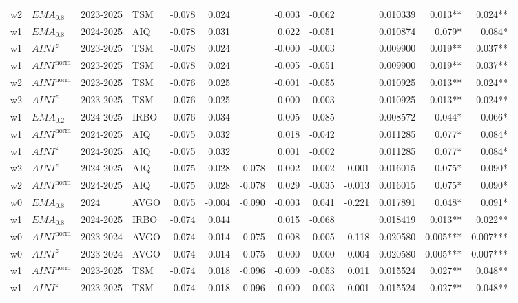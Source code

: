 \begin{longtable}{@{}llllrrrrrrrrr@{}}
w2 & $EMA_{0.8}$ & 2023-2025 & TSM & -0.078 & 0.024 &  & -0.003 & -0.062 &  & 0.010339 & 0.013** & 0.024** \\
w1 & $EMA_{0.8}$ & 2024-2025 & AIQ & -0.078 & 0.031 &  & 0.022 & -0.051 &  & 0.010874 & 0.079* & 0.084* \\
w1 & $AINI^{z}$ & 2023-2025 & TSM & -0.078 & 0.024 &  & -0.000 & -0.003 &  & 0.009900 & 0.019** & 0.037** \\
w1 & $AINI^{\mathrm{norm}}$ & 2023-2025 & TSM & -0.078 & 0.024 &  & -0.005 & -0.051 &  & 0.009900 & 0.019** & 0.037** \\
w2 & $AINI^{\mathrm{norm}}$ & 2023-2025 & TSM & -0.076 & 0.025 &  & -0.001 & -0.055 &  & 0.010925 & 0.013** & 0.024** \\
w2 & $AINI^{z}$ & 2023-2025 & TSM & -0.076 & 0.025 &  & -0.000 & -0.003 &  & 0.010925 & 0.013** & 0.024** \\
w1 & $EMA_{0.2}$ & 2024-2025 & IRBO & -0.076 & 0.034 &  & 0.005 & -0.085 &  & 0.008572 & 0.044* & 0.066* \\
w1 & $AINI^{\mathrm{norm}}$ & 2024-2025 & AIQ & -0.075 & 0.032 &  & 0.018 & -0.042 &  & 0.011285 & 0.077* & 0.084* \\
w1 & $AINI^{z}$ & 2024-2025 & AIQ & -0.075 & 0.032 &  & 0.001 & -0.002 &  & 0.011285 & 0.077* & 0.084* \\
w2 & $AINI^{z}$ & 2024-2025 & AIQ & -0.075 & 0.028 & -0.078 & 0.002 & -0.002 & -0.001 & 0.016015 & 0.075* & 0.090* \\
w2 & $AINI^{\mathrm{norm}}$ & 2024-2025 & AIQ & -0.075 & 0.028 & -0.078 & 0.029 & -0.035 & -0.013 & 0.016015 & 0.075* & 0.090* \\
w0 & $EMA_{0.8}$ & 2024 & AVGO & 0.075 & -0.004 & -0.090 & -0.003 & 0.041 & -0.221 & 0.017891 & 0.048* & 0.091* \\
w1 & $EMA_{0.8}$ & 2024-2025 & IRBO & -0.074 & 0.044 &  & 0.015 & -0.068 &  & 0.018419 & 0.013** & 0.022** \\
w0 & $AINI^{\mathrm{norm}}$ & 2023-2024 & AVGO & 0.074 & 0.014 & -0.075 & -0.008 & -0.005 & -0.118 & 0.020580 & 0.005*** & 0.007*** \\
w0 & $AINI^{z}$ & 2023-2024 & AVGO & 0.074 & 0.014 & -0.075 & -0.000 & -0.000 & -0.004 & 0.020580 & 0.005*** & 0.007*** \\
w1 & $AINI^{\mathrm{norm}}$ & 2023-2025 & TSM & -0.074 & 0.018 & -0.096 & -0.009 & -0.053 & 0.011 & 0.015524 & 0.027** & 0.048** \\
w1 & $AINI^{z}$ & 2023-2025 & TSM & -0.074 & 0.018 & -0.096 & -0.000 & -0.003 & 0.001 & 0.015524 & 0.027** & 0.048** \\

\end{longtable}
